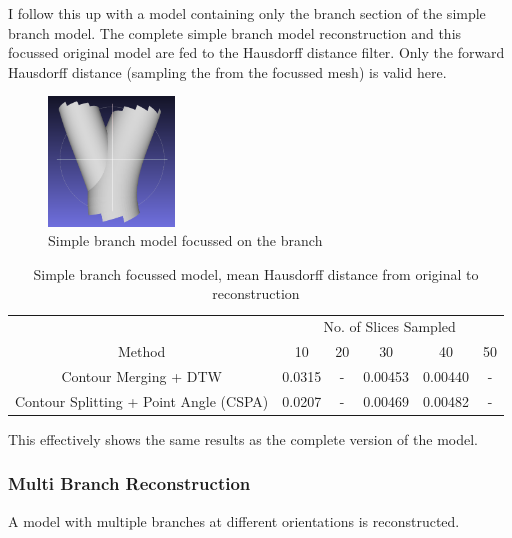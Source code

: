 \documentclass[11p, titlepage]{article}
\begin{document}
I follow this up with a model containing only the branch section of the simple branch model. The complete simple branch model reconstruction and this focussed original model are fed to the Hausdorff distance filter. Only the forward Hausdorff distance (sampling the from the focussed mesh) is valid here.

\begin{figure}[h!]
\centering
\includegraphics[width=0.3\textwidth]{originals/simple-branch-2-6}
\caption{Simple branch model focussed on the branch\label{fig:simple_branch_focussed}}
\end{figure}

\begin{table}[h!]
\begin{tabular}{ | c | c | c | c | c | c | }
\hline
& \multicolumn{5}{c|}{No. of Slices Sampled} \\
\cline{2-6}
Method & 10 & 20 & 30 & 40 & 50 \\
\hline
Contour Merging + DTW & 0.0315 & - & 0.00453 & 0.00440 & - \\
Contour Splitting + Point Angle (CSPA) & 0.0207 & - & 0.00469 & 0.00482 & - \\
\hline
\end{tabular}
\caption{Simple branch focussed model, mean Hausdorff distance from original to reconstruction}
\label{table:simple_branch_focussed_forward}
\end{table}

This effectively shows the same results as the complete version of the model. 
\pagebreak

\subsubsection{Multi Branch Reconstruction}

A model with multiple branches at different orientations is reconstructed.
\end{document}
